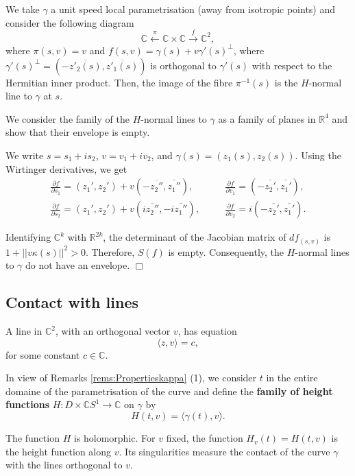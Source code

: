 \documentclass[12pt,a4paper]{article}
\newenvironment{proof}
{\begin{trivlist} \item[\hskip \labelsep {\bf Proof}\hspace*{3 mm}]}
	{\hfill$\Box$\end{trivlist}}
\begin{document}
\begin{proof} We take $\gamma$ a unit speed local parametrisation (away from isotropic points) and consider the following diagram
$$
\mathbb C \xleftarrow{\pi} \mathbb C\times \mathbb C \xrightarrow{f}\mathbb C^2,
$$
where $\pi(s,v)=v$ and $f(s,v)=\gamma(s)+v \gamma'(s)^{\perp}$, where $\gamma'(s)^{\perp}=(-\overline{z'_2(s)},\overline{z'_1(s)})$ is 
orthogonal to $\gamma'(s)$ with respect to the Hermitian inner product. Then, the image of the fibre $\pi^{-1}(s)$ is  the $H$-normal line to $\gamma$ at $s$. 

We consider the family of the $H$-normal lines to $\gamma$ as a family of planes in $\mathbb R^4$ and show that their envelope is empty. 

We write $s=s_1+is_2$, $v=v_1+iv_2$, and  $\gamma(s)=(z_1(s),z_2(s))$.  Using the 
Wirtinger derivatives, we get
$$
\begin{array}{lcl}
\frac{\partial f}{\partial s_1}=(z_1', z_2')+v(-\overline{z_2''},\overline{z_1''}),&\quad&
\frac{\partial f}{\partial v_1}=(-\overline{z_2'},\overline{z_1'}),\\[0.2cm]
\frac{\partial f}{\partial s_2}=(z_1', z_2')+v(i\overline{z_2''},-i\overline{z_1''}),&\quad&
\frac{\partial f}{\partial v_2}=i(-\overline{z_2'},\overline{z_1'}).
\end{array}
$$

Identifying $\mathbb C^k$ with $\mathbb R^{2k}$, the determinant of the Jacobian matrix of $df_{(s,v)}$ is $1+||v\kappa(s)||^2>0$. Therefore, 
$S(f)$ is empty. Consequently, the $H$-normal lines to $\gamma$ do not have an envelope.
\end{proof}

\subsection{Contact with lines}\label{ssec:contactlinesPlaneC}

A line in $\mathbb C^2$, with an orthogonal vector $v$, has equation 
$$
\langle z,{v}\rangle =c,
$$
for some constant $c\in \mathbb C$.

In view of Remarks \ref{rems:Propertieskappa} (1), we 
consider $t$ in  the entire domaine of the parametrisation of the curve and define the {\bf family of height functions} $H:D\times \mathbb CS^1\to \mathbb C$
on $\gamma$ by
$$
H(t,v)=\langle \gamma(t),{v}\rangle.
$$ 

The function $H$ is holomorphic. For $v$ fixed, the function  $H_v(t)=H(t,v)$ is the height function along $v$.
Its singularities measure the contact of the curve $\gamma$ with the lines orthogonal to $v$.
\end{document}
